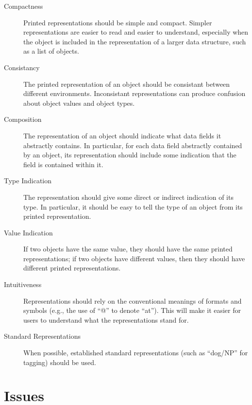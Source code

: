 \documentclass[11pt]{article}
\begin{document}
  \begin{description}

    \item[Compactness] Printed representations should be simple and
    compact.  Simpler representations are easier to read and easier to
    understand, especially when the object is included in the
    representation of a larger data structure, such as a list of
    objects.

    \item[Consistancy] The printed representation of an object should
    be consistant between different environments.  Inconsistant
    representations can produce confusion about object values and
    object types.

    \item[Composition] The representation of an object should indicate
    what data fields it abstractly contains.  In particular, for each
    data field abstractly contained by an object, its representation
    should include some indication that the field is contained within
    it.

    \item[Type Indication] The representation should give some direct
    or indirect indication of its type.  In particular, it should be
    easy to tell the type of an object from its printed
    representation.

    \item[Value Indication] If two objects have the same value, they
    should have the same printed representations; if two objects have
    different values, then they should have different printed
    representations.

    \item[Intuitiveness] Representations should rely on the
    conventional meanings of formats and symbols (e.g., the use of
    ``@'' to denote ``at'').  This will make it easier for users to
    understand what the representations stand for.

    \item[Standard Representations] When possible, established
    standard representations (such as ``dog/NP'' for tagging) should
    be used.

  \end{description}

\section{Issues}
\end{document}
